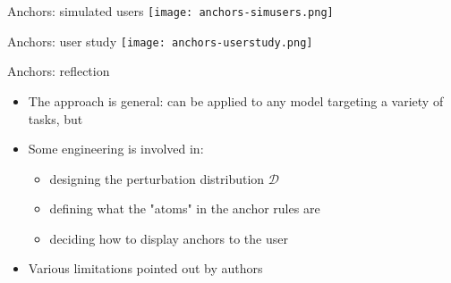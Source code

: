 \documentclass[aspectratio=169]{beamer}
\begin{document}
\begin{frame}{Anchors: simulated users} \centering
\texttt{[image: anchors-simusers.png]}
\end{frame}
\begin{frame}{Anchors: user study} \centering
\texttt{[image: anchors-userstudy.png]}
\end{frame}


\begin{frame}{Anchors: reflection}
\begin{itemize}
	\item The approach is general: can be applied to any model targeting a variety of tasks, but
	\item Some engineering is involved in:
	\begin{itemize}
		\item designing the perturbation distribution $\mathcal D$
		\item defining what the "atoms" in the anchor rules are
		\item deciding how to display anchors to the user
	\end{itemize}
	\item Various limitations pointed out by authors
\end{itemize}
\end{frame}
\end{document}
